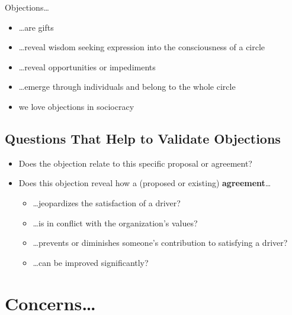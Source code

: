 Objections{\ldots}

\begin{itemize}
\item {\ldots}are gifts

\item {\ldots}reveal wisdom seeking expression into the consciousness of a circle

\item {\ldots}reveal opportunities or impediments

\item {\ldots}emerge through individuals and belong to the whole circle

\item we love objections in sociocracy

\end{itemize}

\subsection{Questions That Help to Validate Objections}
\label{questionsthathelptovalidateobjections}

\begin{itemize}
\item Does the objection relate to this specific proposal or agreement?

\item Does this objection reveal how a (proposed or existing) \textbf{agreement}{\ldots}

\begin{itemize}
\item {\ldots}jeopardizes the satisfaction of a driver?

\item {\ldots}is in conflict with the organization's values?

\item {\ldots}prevents or diminishes someone's contribution to satisfying a driver?

\item {\ldots}can be improved significantly?

\end{itemize}

\end{itemize}

\section{Concerns{\ldots}}
\label{concerns...}

